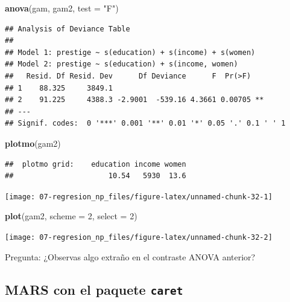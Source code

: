 \documentclass[
  spanish,
]{book}
\newenvironment{Shaded}{\begin{snugshade}}{\end{snugshade}}
\newcommand{\DataTypeTok}[1]{\textcolor[rgb]{0.13,0.29,0.53}{#1}}
\newcommand{\DecValTok}[1]{\textcolor[rgb]{0.00,0.00,0.81}{#1}}
\newcommand{\KeywordTok}[1]{\textcolor[rgb]{0.13,0.29,0.53}{\textbf{#1}}}
\newcommand{\NormalTok}[1]{#1}
\newcommand{\StringTok}[1]{\textcolor[rgb]{0.31,0.60,0.02}{#1}}
\theoremstyle{break}
\theoremstyle{definition}
\theoremstyle{definition}
\theoremstyle{definition}
\theoremstyle{remark}
\begin{document}
\begin{Shaded}
\begin{Highlighting}[]
\KeywordTok{anova}\NormalTok{(gam, gam2, }\DataTypeTok{test =} \StringTok{"F"}\NormalTok{)}
\end{Highlighting}
\end{Shaded}

\begin{verbatim}
## Analysis of Deviance Table
## 
## Model 1: prestige ~ s(education) + s(income) + s(women)
## Model 2: prestige ~ s(education) + s(income, women)
##   Resid. Df Resid. Dev      Df Deviance      F  Pr(>F)   
## 1    88.325     3849.1                                   
## 2    91.225     4388.3 -2.9001  -539.16 4.3661 0.00705 **
## ---
## Signif. codes:  0 '***' 0.001 '**' 0.01 '*' 0.05 '.' 0.1 ' ' 1
\end{verbatim}

\begin{Shaded}
\begin{Highlighting}[]
\KeywordTok{plotmo}\NormalTok{(gam2)}
\end{Highlighting}
\end{Shaded}

\begin{verbatim}
##  plotmo grid:    education income women
##                      10.54   5930  13.6
\end{verbatim}

\begin{center}\texttt{[image: 07-regresion\_np\_files/figure-latex/unnamed-chunk-32-1]} \end{center}

\begin{Shaded}
\begin{Highlighting}[]
\KeywordTok{plot}\NormalTok{(gam2, }\DataTypeTok{scheme =} \DecValTok{2}\NormalTok{, }\DataTypeTok{select =} \DecValTok{2}\NormalTok{)}
\end{Highlighting}
\end{Shaded}

\begin{center}\texttt{[image: 07-regresion\_np\_files/figure-latex/unnamed-chunk-32-2]} \end{center}

Pregunta: ¿Observas algo extraño en el contraste ANOVA anterior?

\hypertarget{mars-con-el-paquete-caret}{%
\subsection{\texorpdfstring{MARS con el paquete \texttt{caret}}{MARS con el paquete caret}}\label{mars-con-el-paquete-caret}}
\end{document}
